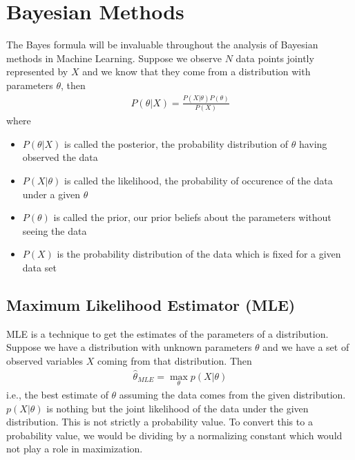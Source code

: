 \documentclass[../statistical_learning_notes.tex]{subfiles}
\begin{document}
\chapter{Bayesian Methods}
The Bayes formula will be invaluable throughout the analysis of Bayesian methods in Machine Learning. Suppose we observe $N$ data points jointly represented by $X$ and we know that they come from a distribution with parameters $\theta$, then
\begin{align*}
    P(\theta|X) = \frac{P(X|\theta)P(\theta)}{P(X)}
\end{align*}
where
\begin{itemize}
    \item $P(\theta|X)$ is called the posterior, the probability distribution of $\theta$ having observed the data
    \item $P(X|\theta)$ is called the likelihood, the probability of occurence of the data under a given $\theta$
    \item $P(\theta)$ is called the prior, our prior beliefs about the parameters without seeing the data
    \item $P(X)$ is the probability distribution of the data which is fixed for a given data set
\end{itemize}


\section{Maximum Likelihood Estimator (MLE)}
MLE is a technique to get the estimates of the parameters of a distribution. Suppose we have a distribution with unknown parameters $\theta$ and we have a set of observed variables $X$ coming from that distribution. Then
\begin{align*}
    \hat{\theta}_{MLE} = \max_{\theta}p(X|\theta)
\end{align*}
i.e., the best estimate of $\theta$ assuming the data comes from the given distribution. $p(X|\theta)$ is nothing but the joint likelihood of the data under the given distribution. This is not strictly a probability value. To convert this to a probability value, we would be dividing by a normalizing constant which would not play a role in maximization.\newline
\end{document}
